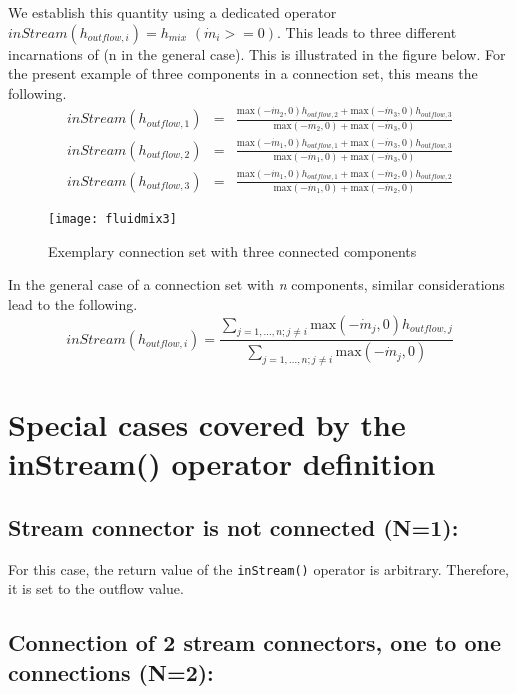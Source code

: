 We establish this quantity using a dedicated operator $inStream(h_{outflow,i})=h_{mix}$ $(\dot{m}_{i} >= 0)$. This leads to
three different incarnations of (n in the general case). This is
illustrated in the figure below. For the present example of three
components in a connection set, this means the following.
\begin{eqnarray*}
inStream(h_{outflow,1})&=&\frac{\text{max}(-\dot{m}_2,0)h_{outflow,2}+\text{max}(-\dot{m}_3,0)h_{outflow,3}}{\text{max}(-\dot{m}_2,0)+\text{max}(-\dot{m}_3,0)}\\
inStream(h_{outflow,2})&=&\frac{\text{max}(-\dot{m}_1,0)h_{outflow,1}+\text{max}(-\dot{m}_3,0)h_{outflow,3}}{\text{max}(-\dot{m}_1,0)+\text{max}(-\dot{m}_3,0)}\\
inStream(h_{outflow,3})&=&\frac{\text{max}(-\dot{m}_1,0)h_{outflow,1}+\text{max}(-\dot{m}_2,0)h_{outflow,2}}{\text{max}(-\dot{m}_1,0)+\text{max}(-\dot{m}_2,0)}
\end{eqnarray*}
\begin{figure}[H]
\caption{Exemplary connection set with three connected components}
\begin{center}
\texttt{[image: fluidmix3]}
\end{center}
\end{figure}

In the general case of a connection set with \emph{n} components,
similar considerations lead to the following.
\begin{equation*}
inStream(h_{outflow,i})=\frac{\sum_{j=1,...,n;j\neq i}\text{max}(-\dot{m}_j,0)h_{outflow,j}}{\sum_{j=1,...,n;j\neq i}\text{max}(-\dot{m}_j,0)}
\end{equation*}

\section{Special cases covered by the inStream() operator definition}
\subsection{Stream connector is not connected (N=1):}
For this case, the return value of the \lstinline!inStream()! operator is arbitrary.
Therefore, it is set to the outflow value.

\subsection{Connection of 2 stream connectors, one to one connections (N=2):}

